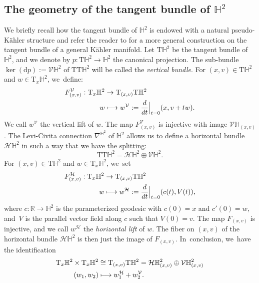 \documentclass[10pt]{amsart}
\newcommand\mto{\mathchoice{\longmapsto}{\mapsto}{\mapsto}{\mapsto}}
\theoremstyle{plain}
\theoremstyle{definition}
\begin{document}
\subsection{The geometry of the tangent bundle of \texorpdfstring{$\mathbb{H}^2$}{H2}}
\label{The_geometry_of_the_tangent bundle}
We briefly recall how the tangent bundle of $\mathbb{H}^2$ is endowed with a natural pseudo-Kähler structure and refer the reader to \cite{canonical_pseudo} for a more general construction on the tangent bundle of a general Kähler manifold. Let $\mathrm{T}\mathbb{H}^2$ be the tangent bundle of $\mathbb{H}^2$, and we denote by $p:\mathrm{T}\mathbb{H}^2\to\mathbb{H}^2$ the canonical projection. The sub-bundle $\ker(\mathrm{d}p) := \mathcal{V}\mathbb{H}^2$ of $\mathrm{T}\mathrm{T}\mathbb{H}^2$ will be called the \emph{vertical bundle}. For $(x,v)\in \mathrm{T}\mathbb{H}^2$ and $w\in\mathrm{T}_x\mathbb{H}^2$, we~define:
\[
\begin{aligned}
F^{\mathcal{V}}_{(x,v)}: \mathrm{T}_x\mathbb{H}^2 & \to \mathrm{T}_{(x,v)}\mathrm{T}\mathbb{H}^2 \\
w &\mto w^{\mathcal{V}}:=\frac{d}{dt}\Big\lvert_{t=0} (x,v+tw).
\end{aligned}
\]
We call $w^{\mathcal{V}}$ the vertical lift of $w$. The map $F^{\mathcal{V}}_{(x,v)}$ is injective with image $\mathcal{V}\mathbb{H}_{(x,v)}$.
The Levi-Civita connection $\nabla^{\mathbb{H}^2}$ of $\mathbb{H}^2$ allows us to define a horizontal bundle $\mathcal{H}\mathbb{H}^2$ in such a way that we have the splitting:
\[
\mathrm{T}\mathrm{T}\mathbb{H}^2=\mathcal{H}\mathbb{H}^2\oplus \mathcal{V}\mathbb{H}^2.
\]
For $(x,v)\in \mathrm{T}\mathbb{H}^2$ and $w\in\mathrm{T}_x\mathbb{H}^2$, we~set
\[
\begin{aligned}
F_{(x,v)}^{\mathcal{H}}:\mathrm{T}_x\mathbb{H}^2 & \to \mathrm{T}_{(x,v)}\mathrm{T}\mathbb{H}^2 \\
w &\mto w^{\mathcal{H}}:=\frac{d}{dt}\Big\lvert_{t=0} (c(t),V(t)),
\end{aligned}
\]
where $c:\mathbb{R}\to\mathbb{H}^2$ is the parameterized geodesic with $c(0)=x$ and $c'(0)=w$, and~$V$ is the parallel vector field along $c$ such that $V(0)=v$. The map $F_{(x,v)}$ is injective, and we call $w^{\mathcal{H}}$ the \emph{horizontal lift} of $w$. The fiber on $(x,v)$ of the horizontal bundle $\mathcal{H}\mathbb{H}^2$ is then just the image of $F_{(x,v)}$. In~conclusion, we~have the identification
\begin{equation}\label{splittangent}
\begin{aligned}
\mathrm{T}_x\mathbb{H}^2\times \mathrm{T}_x\mathbb{H}^2 & \cong \mathrm{T}_{(x,v)}\mathrm{T}\mathbb{H}^2=\mathcal{H}\mathbb{H}^2_{(x,v)}\oplus \mathcal{V}\mathbb{H}^2_{(x,v)} \\
(w_1,w_2) & \mto w_1^{\mathcal{H}}+w_2^{\mathcal{V}}.
\end{aligned}
\end{equation}
\end{document}
